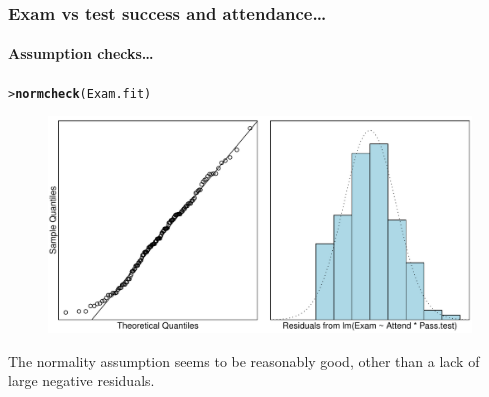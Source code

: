 \documentclass{beamer}\usepackage[]{graphicx}\usepackage[]{xcolor}
\makeatletter
\newcommand{\hlstd}[1]{\textcolor[rgb]{0.345,0.345,0.345}{#1}}%
\newcommand{\hlkwd}[1]{\textcolor[rgb]{0.737,0.353,0.396}{\textbf{#1}}}%
\newenvironment{kframe}{%
 \def\at@end@of@kframe{}%
 \ifinner\ifhmode%
  \def\at@end@of@kframe{\end{minipage}}%
  \begin{minipage}{\columnwidth}%
 \fi\fi%
 \def\FrameCommand##1{\hskip\@totalleftmargin \hskip-\fboxsep
 \colorbox{shadecolor}{##1}\hskip-\fboxsep
     \hskip-\linewidth \hskip-\@totalleftmargin \hskip\columnwidth}%
 \MakeFramed {\advance\hsize-\width
   \@totalleftmargin\z@ \linewidth\hsize
   \@setminipage}}%
 {\par\unskip\endMakeFramed%
 \at@end@of@kframe}
\newenvironment{knitrout}{}{} %
\makeatother
\begin{document}
\begin{frame}[fragile]
\frametitle{Exam vs test success and attendance\ldots}
\framesubtitle{Assumption checks\ldots}
\begin{knitrout}\scriptsize
{}\color{fgcolor}\begin{kframe}
\begin{alltt}
\hlstd{> }\hlkwd{normcheck}\hlstd{(Exam.fit)}
\end{alltt}
\end{kframe}
\end{knitrout}



\begin{figure}
  \centering
  \includegraphics[scale = 0.5]{figure/RC-H12-011}
\end{figure}

The normality assumption seems to be reasonably good, other than a lack of large negative residuals.
\end{frame}
\end{document}
